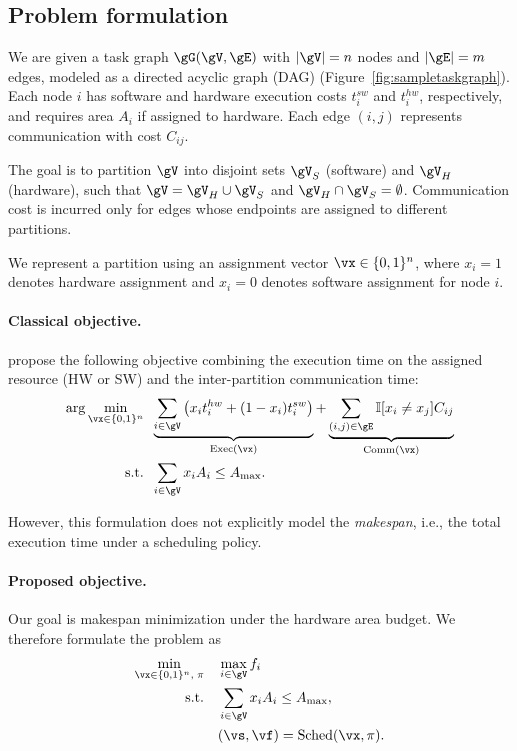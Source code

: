 \subsection{Problem formulation}
We are given a task graph $\gG(\gV, \gE)$ with $|\gV| = n$ nodes and $|\gE| = m$ edges, modeled as a directed acyclic graph (DAG) (Figure~\ref{fig:sampletaskgraph}). Each node $i$ has software and hardware execution costs $t^{sw}_i$ and $t^{hw}_i$, respectively, and requires area $A_i$ if assigned to hardware. Each edge $(i,j)$ represents communication with cost $C_{ij}$.

The goal is to partition $\gV$ into disjoint sets $\gV_S$ (software) and $\gV_H$ (hardware), such that $\gV = \gV_H \cup \gV_S$ and $\gV_H \cap \gV_S = \emptyset$. Communication cost is incurred only for edges whose endpoints are assigned to different partitions.

We represent a partition using an assignment vector $\vx \in \{0,1\}^n$, where $x_i = 1$ denotes hardware assignment and $x_i = 0$ denotes software assignment for node $i$.

\paragraph{\textbf{Classical objective.}}
\citet{arato2005algorithmic} propose the following objective combining the execution time on the assigned resource (HW or SW) and the inter-partition communication time:
\begin{align}
    \arg\min_{\vx \in \{0,1\}^n} \;\;
    & \underbrace{\sum_{i \in \gV} \big(x_i t^{hw}_i + (1 - x_i) t^{sw}_i\big)}_{\mathrm{Exec}(\vx)}
    + \underbrace{\sum_{(i,j) \in \gE} \mathbb{I}[x_i \neq x_j] C_{ij}}_{\mathrm{Comm}(\vx)} \\
    \textrm{s.t.} \;\;
    & \sum_{i \in \gV} x_i A_i \leq A_{\max}.
\end{align}

However, this formulation does not explicitly model the \emph{makespan}, i.e., the total execution time under a scheduling policy.

\paragraph{\textbf{Proposed objective.}}
Our goal is makespan minimization under the hardware area budget. We therefore formulate the problem as
\begin{align}
\min_{\vx \in \{0,1\}^n,\;\pi}\quad & \max_{i\in\gV} f_i
\label{eq:true_obj}\\
\text{s.t.}\quad
& \sum_{i\in\gV} x_i A_i \le A_{\max},
\label{eq:true_area}\\
& (\vs,\vf)=\mathrm{Sched}(\vx,\pi).
\label{eq:true_sched}
\end{align}

